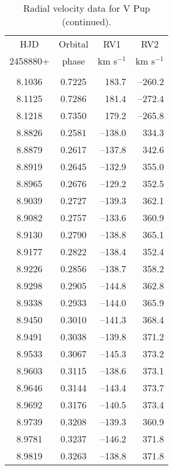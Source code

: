 \documentclass[useAMS,usenatbib]{mnras}                                                                           \usepackage[pdftex]{graphicx}
\begin{document}
\setcounter{table}{4}
\begin{table}
\begin{center}
\caption{Radial velocity data for V Pup (continued).
\label{tbl-5a}}   
\begin{footnotesize}
   \begin{tabular}{ccrr} 
\multicolumn{1}{c}{HJD}  & \multicolumn{1}{c}{Orbital} & 
\multicolumn{1}{c}{RV1} & \multicolumn{1}{c}{RV2}  \\ 
\multicolumn{1}{c}{2458880+}  & \multicolumn{1}{c}{phase } &
\multicolumn{1}{c}{km s$^{-1}$} & \multicolumn{1}{c}{km s$^{-1}$} \\
\hline \\   
8.1036&	0.7225&	183.7&	--260.2\\ 	   
8.1125&	0.7286&	181.4&	--272.4\\	   
8.1218&	0.7350&	179.2&	--265.8\\ 	   
8.8826&	0.2581&	--138.0&	334.3\\ 	   
8.8879&	0.2617&	--137.8&	342.6\\ 	   
8.8919&	0.2645&	--132.9&	355.0\\ 	   
8.8965&	0.2676&	--129.2&	352.5\\ 	   
8.9039&	0.2727&	--139.3&	362.1\\ 	   
8.9082&	0.2757&	--133.6&	360.9\\ 	   
8.9130&	0.2790&	--138.8&	365.1\\ 	   
8.9177&	0.2822&	--138.4&	352.4\\ 	   
8.9226&	0.2856&	--138.7&	358.2\\ 	   
8.9298&	0.2905&	--144.8&	362.8\\ 	   
8.9338&	0.2933&	--144.0&	365.9\\ 	   
8.9450&	0.3010&	--141.3&	368.4\\ 	   
8.9491&	0.3038&	--139.8&	371.2\\ 	   
8.9533&	0.3067&	--145.3&	373.2\\ 	   
8.9603&	0.3115&	--138.6&	373.1\\ 	   
8.9646&	0.3144&	--143.4&	373.7\\ 	   
8.9692&	0.3176&	--140.5&	373.4\\ 	   
8.9739&	0.3208&	--139.3&	360.9\\ 	   
8.9781&	0.3237&	--146.2&	371.8\\ 	   
8.9819&	0.3263&	--138.8&	371.8\\ 	   

\end{tabular}
\end{footnotesize}
\end{center}
\end{table}
\end{document}
